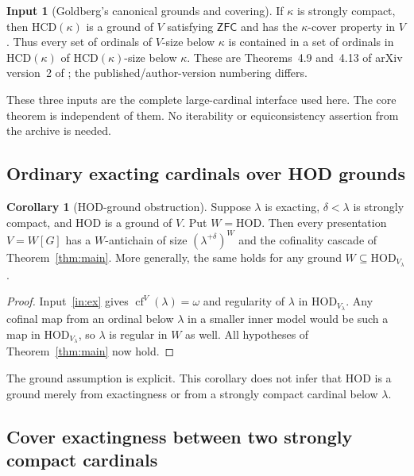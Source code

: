 \documentclass[11pt,letterpaper]{article}
\theoremstyle{definition}
\newtheorem{corollary}[definition]{Corollary}
\newtheorem{inputthm}{Input}
\numberwithin{equation}{section}
\newcommand{\ZFC}{\mathsf{ZFC}}
\newcommand{\HOD}{\mathrm{HOD}}
\newcommand{\HCD}{\mathrm{HCD}}
\newcommand{\cf}{\operatorname{cf}}
\begin{document}
\begin{inputthm}[Goldberg's canonical grounds and covering]\label{in:hcd}
If $\kappa$ is strongly compact, then $\HCD(\kappa)$ is a ground of $V$ satisfying $\ZFC$ and has the $\kappa$-cover property in $V$. Thus every set of ordinals of $V$-size below $\kappa$ is contained in a set of ordinals in $\HCD(\kappa)$ of $\HCD(\kappa)$-size below $\kappa$. These are Theorems~4.9 and~4.13 of arXiv version~2 of \cite{goldberg}; the published/author-version numbering differs.
\end{inputthm}

These three inputs are the complete large-cardinal interface used here. The core theorem is independent of them. No iterability or equiconsistency assertion from the archive is needed.

\subsection{Ordinary exacting cardinals over HOD grounds}

\begin{corollary}[HOD-ground obstruction]\label{cor:hod}
Suppose $\lambda$ is exacting, $\delta<\lambda$ is strongly compact, and $\HOD$ is a ground of $V$. Put $W=\HOD$. Then every presentation $V=W[G]$ has a $W$-antichain of size $(\lambda^{+\delta})^W$ and the cofinality cascade of Theorem~\ref{thm:main}.
More generally, the same holds for any ground $W\subseteq\HOD_{V_\lambda}$.
\end{corollary}
\begin{proof}
Input~\ref{in:ex} gives $\cf^V(\lambda)=\omega$ and regularity of $\lambda$ in $\HOD_{V_\lambda}$. Any cofinal map from an ordinal below $\lambda$ in a smaller inner model would be such a map in $\HOD_{V_\lambda}$, so $\lambda$ is regular in $W$ as well. All hypotheses of Theorem~\ref{thm:main} now hold.
\end{proof}

The ground assumption is explicit. This corollary does not infer that HOD is a ground merely from exactingness or from a strongly compact cardinal below $\lambda$.

\subsection{Cover exactingness between two strongly compact cardinals}
\end{document}
